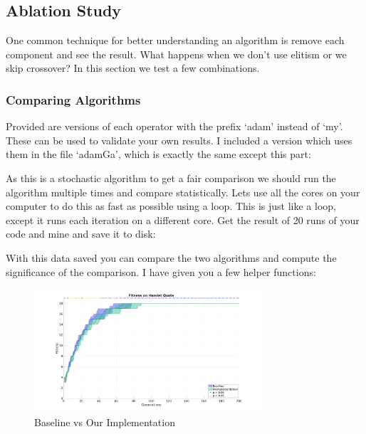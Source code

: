 \documentclass{article}
\begin{document}
\subsection{Ablation Study}
One common technique for better understanding an algorithm is remove each component and see the result. What happens when we don't use elitism or we skip crossover? In this section we test a few combinations. 

\subsubsection{Comparing Algorithms}
Provided are versions of each operator with the prefix `adam' instead of `my'. These can be used to validate your own results. I included a version which uses them in the file `adamGa', which is exactly the same except this part:

	

As this is a stochastic algorithm to get a fair comparison we should run the algorithm multiple times and compare statistically. Lets use all the cores on your computer to do this as fast as possible using a  loop. This is just like a  loop, except it runs each iteration on a different core. Get the result of 20 runs of your code and mine and save it to disk:

	

With this data saved you can compare the two algorithms and compute the significance of the comparison. I have given you a few helper functions:

	

	\begin{figure}[h!]
	\begin{center}
	\includegraphics[width=0.75\textwidth]{img/myStandard.png}
	\caption{\color{blue}Baseline vs Our Implementation}
	\end{center}
	\end{figure}
	
\end{document}
